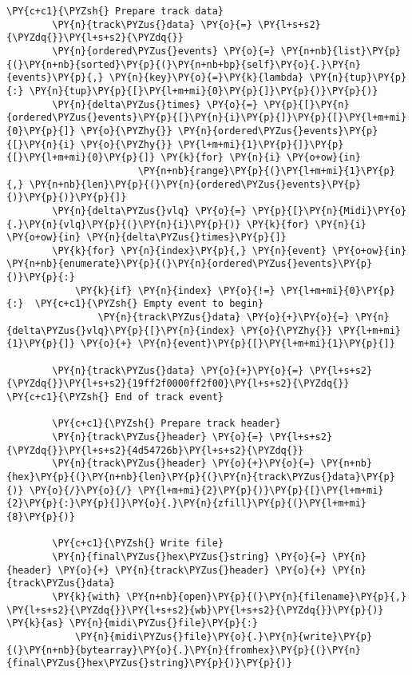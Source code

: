 \begin{Verbatim}[commandchars=\\\{\}]
        \PY{c+c1}{\PYZsh{} Prepare track data}
        \PY{n}{track\PYZus{}data} \PY{o}{=} \PY{l+s+s2}{\PYZdq{}}\PY{l+s+s2}{\PYZdq{}}
        \PY{n}{ordered\PYZus{}events} \PY{o}{=} \PY{n+nb}{list}\PY{p}{(}\PY{n+nb}{sorted}\PY{p}{(}\PY{n+nb+bp}{self}\PY{o}{.}\PY{n}{events}\PY{p}{,} \PY{n}{key}\PY{o}{=}\PY{k}{lambda} \PY{n}{tup}\PY{p}{:} \PY{n}{tup}\PY{p}{[}\PY{l+m+mi}{0}\PY{p}{]}\PY{p}{)}\PY{p}{)}
        \PY{n}{delta\PYZus{}times} \PY{o}{=} \PY{p}{[}\PY{n}{ordered\PYZus{}events}\PY{p}{[}\PY{n}{i}\PY{p}{]}\PY{p}{[}\PY{l+m+mi}{0}\PY{p}{]} \PY{o}{\PYZhy{}} \PY{n}{ordered\PYZus{}events}\PY{p}{[}\PY{n}{i} \PY{o}{\PYZhy{}} \PY{l+m+mi}{1}\PY{p}{]}\PY{p}{[}\PY{l+m+mi}{0}\PY{p}{]} \PY{k}{for} \PY{n}{i} \PY{o+ow}{in}
                       \PY{n+nb}{range}\PY{p}{(}\PY{l+m+mi}{1}\PY{p}{,} \PY{n+nb}{len}\PY{p}{(}\PY{n}{ordered\PYZus{}events}\PY{p}{)}\PY{p}{)}\PY{p}{]}
        \PY{n}{delta\PYZus{}vlq} \PY{o}{=} \PY{p}{[}\PY{n}{Midi}\PY{o}{.}\PY{n}{vlq}\PY{p}{(}\PY{n}{i}\PY{p}{)} \PY{k}{for} \PY{n}{i} \PY{o+ow}{in} \PY{n}{delta\PYZus{}times}\PY{p}{]}
        \PY{k}{for} \PY{n}{index}\PY{p}{,} \PY{n}{event} \PY{o+ow}{in} \PY{n+nb}{enumerate}\PY{p}{(}\PY{n}{ordered\PYZus{}events}\PY{p}{)}\PY{p}{:}
            \PY{k}{if} \PY{n}{index} \PY{o}{!=} \PY{l+m+mi}{0}\PY{p}{:}  \PY{c+c1}{\PYZsh{} Empty event to begin}
                \PY{n}{track\PYZus{}data} \PY{o}{+}\PY{o}{=} \PY{n}{delta\PYZus{}vlq}\PY{p}{[}\PY{n}{index} \PY{o}{\PYZhy{}} \PY{l+m+mi}{1}\PY{p}{]} \PY{o}{+} \PY{n}{event}\PY{p}{[}\PY{l+m+mi}{1}\PY{p}{]}

        \PY{n}{track\PYZus{}data} \PY{o}{+}\PY{o}{=} \PY{l+s+s2}{\PYZdq{}}\PY{l+s+s2}{19ff2f0000ff2f00}\PY{l+s+s2}{\PYZdq{}}  \PY{c+c1}{\PYZsh{} End of track event}

        \PY{c+c1}{\PYZsh{} Prepare track header}
        \PY{n}{track\PYZus{}header} \PY{o}{=} \PY{l+s+s2}{\PYZdq{}}\PY{l+s+s2}{4d54726b}\PY{l+s+s2}{\PYZdq{}}
        \PY{n}{track\PYZus{}header} \PY{o}{+}\PY{o}{=} \PY{n+nb}{hex}\PY{p}{(}\PY{n+nb}{len}\PY{p}{(}\PY{n}{track\PYZus{}data}\PY{p}{)} \PY{o}{/}\PY{o}{/} \PY{l+m+mi}{2}\PY{p}{)}\PY{p}{[}\PY{l+m+mi}{2}\PY{p}{:}\PY{p}{]}\PY{o}{.}\PY{n}{zfill}\PY{p}{(}\PY{l+m+mi}{8}\PY{p}{)}

        \PY{c+c1}{\PYZsh{} Write file}
        \PY{n}{final\PYZus{}hex\PYZus{}string} \PY{o}{=} \PY{n}{header} \PY{o}{+} \PY{n}{track\PYZus{}header} \PY{o}{+} \PY{n}{track\PYZus{}data}
        \PY{k}{with} \PY{n+nb}{open}\PY{p}{(}\PY{n}{filename}\PY{p}{,} \PY{l+s+s2}{\PYZdq{}}\PY{l+s+s2}{wb}\PY{l+s+s2}{\PYZdq{}}\PY{p}{)} \PY{k}{as} \PY{n}{midi\PYZus{}file}\PY{p}{:}
            \PY{n}{midi\PYZus{}file}\PY{o}{.}\PY{n}{write}\PY{p}{(}\PY{n+nb}{bytearray}\PY{o}{.}\PY{n}{fromhex}\PY{p}{(}\PY{n}{final\PYZus{}hex\PYZus{}string}\PY{p}{)}\PY{p}{)}


\end{Verbatim}
